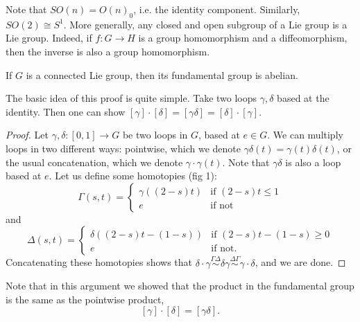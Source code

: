 \documentclass{../mathnotes}
\begin{document}
\begin{rem}
    Note that $SO(n)=O(n)_0$, i.e. the identity component. Similarly, $SO(2)\cong S^1$. More generally, any closed and open subgroup of a Lie group is
    a Lie group. Indeed, if $f:G\to H$ is a group homomorphism and a diffeomorphism, then the inverse is also a group homomorphism.
\end{rem}

\begin{thm}
    If $G$ is a connected Lie group, then its fundamental group is abelian.
\end{thm}
The basic idea of this proof is quite simple. Take two loops $\gamma,\delta$ based at the identity. Then one can show $[\gamma]\cdot [\delta]=[\gamma\delta]=[\delta]\cdot[\gamma]$.
\begin{proof}
    Let $\gamma,\delta:[0,1]\to G$ be two loops in $G$, based at $e\in G$. We can multiply loops in two different ways: pointwise, which we denote $\gamma\delta(t)=\gamma(t)\delta(t)$,
    or the usual concatenation, which we denote $\gamma\cdot\gamma(t)$. Note that $\gamma\delta$ is also a loop based at $e$. Let us define some homotopies (fig 1):
    \[
         \Gamma(s,t) =
           \begin{cases}
                  \gamma( (2-s)t) & \text{if } (2-s)t\leq 1 \\
                     e       & \text{if not}
                \end{cases}
                \]
    and
    \[
       \Delta(s,t)=
       \begin{cases}
           \delta( (2-s)t-(1-s)) &\text{if } (2-s)t-(1-s)\geq 0\\
           e & \text{if not}.
       \end{cases}
        \]
        Concatenating these homotopies shows that $\delta\cdot \gamma\overset{\Gamma\Delta}{\sim}\delta\gamma\overset{\Delta\Gamma}{\sim}{\gamma\cdot\delta}$,
        and we are done.
\end{proof}

\begin{rem}
    Note that in this argument we showed that the product in the fundamental group is the same as the pointwise product,
    \[ [\gamma]\cdot[\delta]=[\gamma\delta]. \]
\end{rem}
\end{document}
